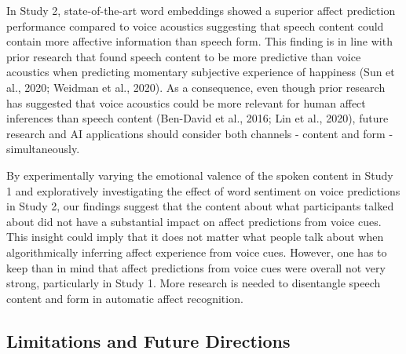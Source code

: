 \documentclass[
  man,floatsintext]{apa6}
\begin{document}
In Study 2, state-of-the-art word embeddings showed a superior affect prediction performance compared to voice acoustics suggesting that speech content could contain more affective information than speech form. This finding is in line with prior research that found speech content to be more predictive than voice acoustics when predicting momentary subjective experience of happiness (Sun et al., 2020; Weidman et al., 2020). As a consequence, even though prior research has suggested that voice acoustics could be more relevant for human affect inferences than speech content (Ben-David et al., 2016; Lin et al., 2020), future research and AI applications should consider both channels - content and form - simultaneously.

By experimentally varying the emotional valence of the spoken content in Study 1 and exploratively investigating the effect of word sentiment on voice predictions in Study 2, our findings suggest that the content about what participants talked about did not have a substantial impact on affect predictions from voice cues. This insight could imply that it does not matter what people talk about when algorithmically inferring affect experience from voice cues. However, one has to keep than in mind that affect predictions from voice cues were overall not very strong, particularly in Study 1. More research is needed to disentangle speech content and form in automatic affect recognition.

\hypertarget{limitations}{%
\subsection{Limitations and Future Directions}\label{limitations}}
\end{document}
